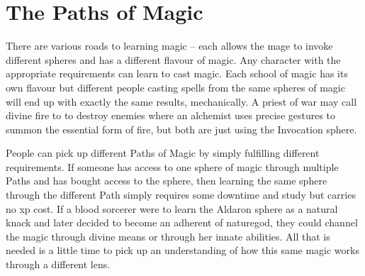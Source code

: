 \chapter{The Paths of Magic}
\label{magic_paths}

\begin{multicols}{2}

There are various roads to learning magic -- each allows the mage to invoke different spheres and has a different flavour of magic.
Any character with the appropriate requirements can learn to cast magic.
Each school of magic has its own flavour but different people casting spells from the same spheres of magic will end up with exactly the same results, mechanically.
A priest of war may call divine fire to to destroy enemies where an alchemist uses precise gestures to summon the essential form of fire, but both are just using the Invocation sphere.

People can pick up different Paths of Magic by simply fulfilling different requirements.
If someone has access to one sphere of magic through multiple Paths and has bought access to the sphere, then learning the same sphere through the different Path simply requires some \gls{downtime} and study but carries no \gls{xp} cost.
If a blood sorcerer were to learn the Aldaron sphere as a natural knack and later decided to become an adherent of \gls{naturegod}, they could channel the magic through divine means or through her innate abilities.
All that is needed is a little time to pick up an understanding of how this same magic works through a different lens.

\end{multicols}


